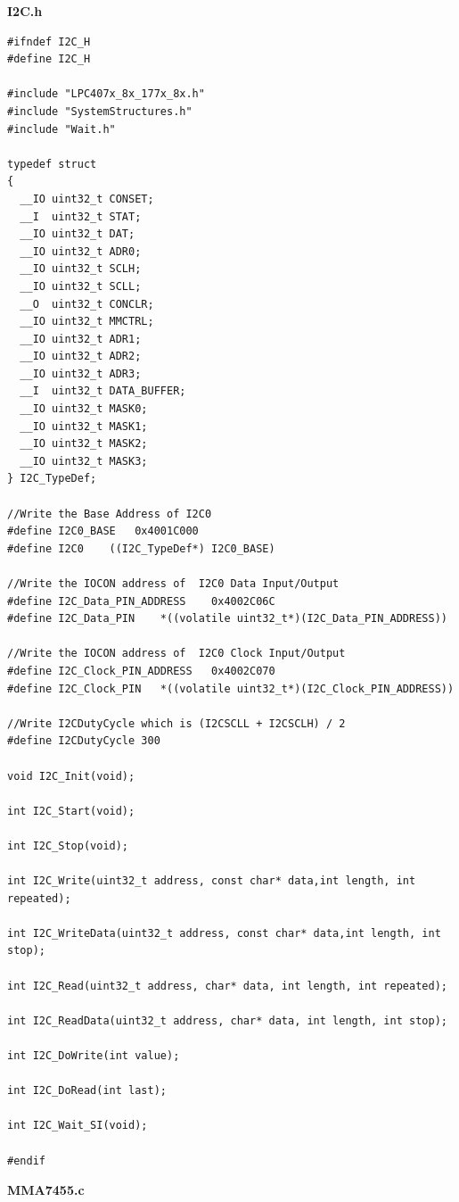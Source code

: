 \documentclass{article}
\begin{document}
\linebreak
\textbf{I2C.h}
\begin{lstlisting}
#ifndef I2C_H
#define I2C_H

#include "LPC407x_8x_177x_8x.h"
#include "SystemStructures.h"
#include "Wait.h"

typedef struct
{
  __IO uint32_t CONSET;
  __I  uint32_t STAT;
  __IO uint32_t DAT;
  __IO uint32_t ADR0;
  __IO uint32_t SCLH;
  __IO uint32_t SCLL;
  __O  uint32_t CONCLR;
  __IO uint32_t MMCTRL;
  __IO uint32_t ADR1;
  __IO uint32_t ADR2;
  __IO uint32_t ADR3;
  __I  uint32_t DATA_BUFFER;
  __IO uint32_t MASK0;
  __IO uint32_t MASK1;
  __IO uint32_t MASK2;
  __IO uint32_t MASK3;
} I2C_TypeDef;

//Write the Base Address of I2C0
#define I2C0_BASE	0x4001C000
#define I2C0	((I2C_TypeDef*) I2C0_BASE)

//Write the IOCON address of  I2C0 Data Input/Output
#define I2C_Data_PIN_ADDRESS	0x4002C06C
#define I2C_Data_PIN	*((volatile uint32_t*)(I2C_Data_PIN_ADDRESS))

//Write the IOCON address of  I2C0 Clock Input/Output
#define I2C_Clock_PIN_ADDRESS	0x4002C070
#define I2C_Clock_PIN	*((volatile uint32_t*)(I2C_Clock_PIN_ADDRESS))

//Write I2CDutyCycle which is (I2CSCLL + I2CSCLH) / 2
#define I2CDutyCycle 300

void I2C_Init(void);

int I2C_Start(void);

int I2C_Stop(void);

int I2C_Write(uint32_t address, const char* data,int length, int repeated);

int I2C_WriteData(uint32_t address, const char* data,int length, int stop);

int I2C_Read(uint32_t address, char* data, int length, int repeated);

int I2C_ReadData(uint32_t address, char* data, int length, int stop);

int I2C_DoWrite(int value);

int I2C_DoRead(int last);

int I2C_Wait_SI(void);
	
#endif

\end{lstlisting}
\linebreak
\textbf{MMA7455.c}
\end{document}
